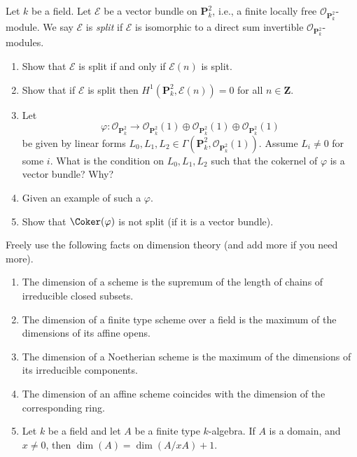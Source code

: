 \begin{exercise}
\label{exercise-nonsplit-vectorbundle}
Let $k$ be a field.
Let $\mathcal{E}$ be a vector bundle on $\mathbf{P}^2_k$, i.e., a finite locally
free $\mathcal{O}_{\mathbf{P}^2_k}$-module.
We say $\mathcal{E}$ is {\it split} if $\mathcal{E}$ is isomorphic to
a direct sum invertible $\mathcal{O}_{\mathbf{P}^2_k}$-modules.
\begin{enumerate}
\item Show that $\mathcal{E}$ is split if and only if $\mathcal{E}(n)$
is split.
\item Show that if $\mathcal{E}$ is split then
$H^1({\mathbf{P}^2_k}, \mathcal{E}(n)) = 0$
for all $n \in \mathbf{Z}$.
\item Let
$$
\varphi :
\mathcal{O}_{\mathbf{P}^2_k}
\longrightarrow
\mathcal{O}_{\mathbf{P}^2_k}(1) \oplus
\mathcal{O}_{\mathbf{P}^2_k}(1) \oplus
\mathcal{O}_{\mathbf{P}^2_k}(1)
$$
be given by linear forms
$L_0, L_1, L_2 \in \Gamma(\mathbf{P}^2_k, \mathcal{O}_{\mathbf{P}^2_k}(1))$.
Assume $L_i \not = 0$ for some $i$.
What is the condition on $L_0, L_1, L_2$ such that
the cokernel of $\varphi$ is a vector bundle?
Why?
\item Given an example of such a $\varphi$.
\item Show that $\Coker(\varphi)$ is not split (if it is
a vector bundle).
\end{enumerate}
\end{exercise}

\begin{remark}
\label{remark-recall-dimension-theory}
Freely use the following facts on dimension theory
(and add more if you need more).
\begin{enumerate}
\item The dimension of a scheme is the supremum of the length of chains
of irreducible closed subsets.
\item The dimension of a finite type scheme over a field is the maximum
of the dimensions of its affine opens.
\item The dimension of a Noetherian scheme is the maximum of the dimensions
of its irreducible components.
\item The dimension of an affine scheme
coincides with the dimension of the corresponding ring.
\item Let $k$ be a field and let $A$ be a finite type $k$-algebra.
If $A$ is a domain, and $x \not = 0$, then $\dim(A) = \dim(A/xA) + 1$.
\end{enumerate}
\end{remark}

